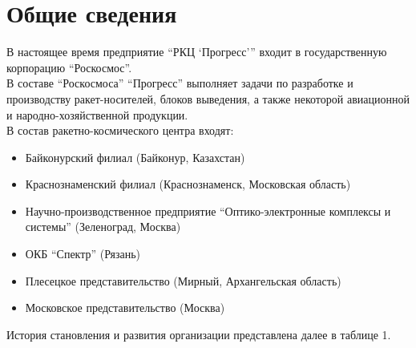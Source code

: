 \section{Общие сведения}
В настоящее время предприятие \enquote{РКЦ \enquote{Прогресс}} входит в государственную корпорацию \enquote{Роскосмос}.\\
В составе \enquote{Роскосмоса} \enquote{Прогресс} выполняет задачи по разработке и производству ракет-носителей, блоков выведения, а также некоторой авиационной и народно-хозяйственной продукции.\\
В состав ракетно-космического центра входят:
\begin{itemize}
    \item Байконурский филиал (Байконур, Казахстан)
    \item Краснознаменский филиал (Краснознаменск, Московская область)
    \item Научно-производственное предприятие \enquote{Оптико-электронные комплексы и системы} (Зеленоград, Москва)
    \item ОКБ \enquote{Спектр} (Рязань)
    \item Плесецкое представительство (Мирный, Архангельская область)
    \item Московское представительство (Москва)
\end{itemize}
История становления и развития организации представлена далее в таблице 1.\\\\
